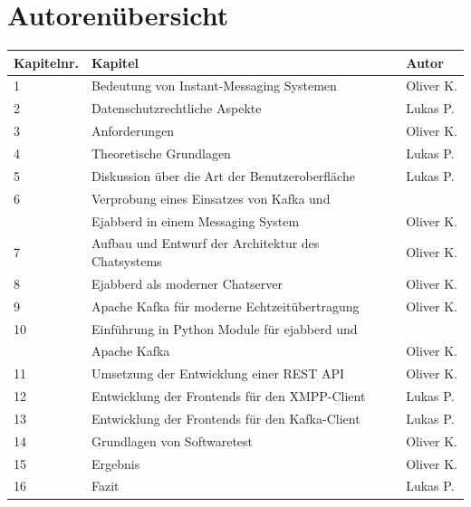 \documentclass[a4paper,titlepage,halfparskip,12pt]{scrreprt}
\begin{document}
\renewcommand{\sectionmark}[1]{\markright{\thesection\ #1}} %



\newpage
{}

\chapter*{Autorenübersicht}
\renewcommand{\arraystretch}{1.5}
\begin{table}[h]
	\centering
	\begin{tabular*}{\linewidth}{lll@{\extracolsep{\fill}}}
		\textbf{Kapitelnr.} & \textbf{Kapitel} & \textbf{Autor} \\
		\hline
		1 & Bedeutung von Instant-Messaging Systemen & Oliver K. \\
		2 & Datenschutzrechtliche Aspekte & Lukas P.\\
		3 & Anforderungen & Oliver K. \\
		4 & Theoretische Grundlagen & Lukas P. \\
		5 & Diskussion über die Art der Benutzeroberfläche & Lukas P.\\
		6 & Verprobung eines Einsatzes von Kafka und &\\
		&Ejabberd in einem Messaging System & Oliver K.\\
		7 & Aufbau und Entwurf der Architektur des Chatsystems & Oliver K.\\
		8 & Ejabberd als moderner Chatserver & Oliver K.\\
		9 & Apache Kafka für moderne Echtzeitübertragung & Oliver K.\\
		10 & Einführung in Python Module für ejabberd und &\\
		& Apache Kafka & Oliver K.\\
		11 & Umsetzung der Entwicklung einer REST API & Oliver K.\\
		12 & Entwicklung der Frontends für den XMPP-Client & Lukas P.\\
		13 & Entwicklung der Frontends für den Kafka-Client & Lukas P.\\
		14 & Grundlagen von Softwaretest & Oliver K.\\
		15 & Ergebnis & Oliver K.\\
		16 & Fazit & Lukas P.\\
	\end{tabular*}
	\label{tab:autorenuebersicht}
\end{table}
\end{document}
